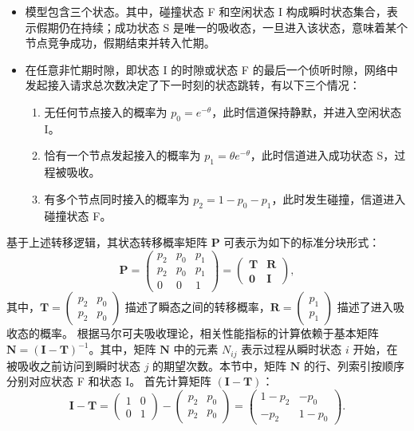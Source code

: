 \begin{itemize}
	\item 模型包含三个状态。其中，碰撞状态 F 和空闲状态 I 构成瞬时状态集合，表示假期仍在持续；成功状态 S 是唯一的吸收态，一旦进入该状态，意味着某个节点竞争成功，假期结束并转入忙期。
	\item 在任意非忙期时隙，即状态 I 的时隙或状态 F 的最后一个侦听时隙，网络中发起接入请求总次数决定了下一时刻的状态跳转，有以下三个情况：
	\begin{enumerate}
		\item 无任何节点接入的概率为 $p_0 = e^{-\theta}$，此时信道保持静默，并进入空闲状态 I。
		\item 恰有一个节点发起接入的概率为 $p_1 = \theta e^{-\theta}$，此时信道进入成功状态 S，过程被吸收。
		\item 有多个节点同时接入的概率为 $p_2 = 1 - p_0 - p_1$，此时发生碰撞，信道进入碰撞状态 F。
	\end{enumerate}
\end{itemize}
基于上述转移逻辑，其状态转移概率矩阵 $\mathbf{P}$ 可表示为如下的标准分块形式：
\begin{equation}
	\mathbf{P} = 
	\begin{pmatrix}
		p_2 & p_0 & p_1 \\
		p_2 & p_0 & p_1 \\
		0 & 0 & 1
	\end{pmatrix}
	=
	\begin{pmatrix}
		\mathbf{T} & \mathbf{R} \\
		\mathbf{0} & \mathbf{I}
	\end{pmatrix},
\end{equation}
其中，$\mathbf{T} = \begin{pmatrix} p_2 & p_0 \\ p_2 & p_0 \end{pmatrix}$ 描述了瞬态之间的转移概率，$\mathbf{R} = \begin{pmatrix} p_1 \\ p_1 \end{pmatrix}$ 描述了进入吸收态的概率。
根据马尔可夫吸收理论\cite{2008_Markov_absorb}，相关性能指标的计算依赖于基本矩阵 $\mathbf{N} = (\mathbf{I} - \mathbf{T})^{-1}$。其中，矩阵 $\mathbf{N}$ 中的元素 $N_{ij}$ 表示过程从瞬时状态 $i$ 开始，在被吸收之前访问到瞬时状态 $j$ 的期望次数。本节中，矩阵 $\mathbf{N}$ 的行、列索引按顺序分别对应状态 F 和状态 I。
首先计算矩阵 $(\mathbf{I} - \mathbf{T})$：
\begin{equation}
	\mathbf{I} - \mathbf{T} = 
	\begin{pmatrix} 1 & 0 \\ 0 & 1 \end{pmatrix} - \begin{pmatrix} p_2 & p_0 \\ p_2 & p_0 \end{pmatrix} 
	= \begin{pmatrix} 1-p_2 & -p_0 \\ -p_2 & 1-p_0 \end{pmatrix}.
\end{equation}
